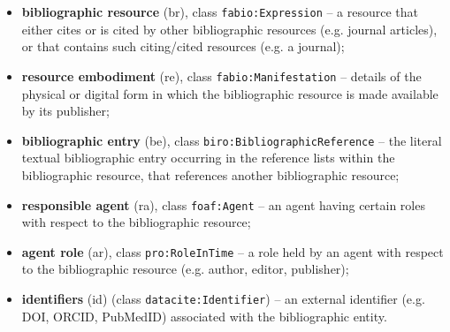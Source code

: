 \documentclass[runningheads,a4paper]{llncs}
\begin{document}
\begin{itemize}
\item {\bf bibliographic resource} (br), class \Verb+fabio:Expression+ -- a resource that either cites or is cited by other bibliographic resources (e.g. journal articles), or that contains such citing/cited resources (e.g. a journal);
\item {\bf resource embodiment} (re), class \Verb+fabio:Manifestation+ -- details of the physical or digital form in which the bibliographic resource is made available by its publisher;
\item {\bf bibliographic entry} (be), class \Verb+biro:BibliographicReference+ -- the literal textual bibliographic entry occurring in the reference lists within the bibliographic resource, that references another bibliographic resource;
\item {\bf responsible agent} (ra), class \Verb+foaf:Agent+ -- an agent having certain roles with respect to the bibliographic resource;
\item {\bf agent role} (ar), class \Verb+pro:RoleInTime+ -- a role held by an agent with respect to the bibliographic resource (e.g. author, editor, publisher);
\item {\bf identifiers} (id) (class \Verb+datacite:Identifier+) -- an external identifier (e.g. DOI, ORCID, PubMedID) associated with the bibliographic entity.
\end{itemize}
\end{document}
